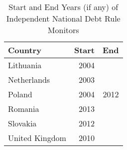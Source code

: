 \begin{table}[ht]
\centering
\caption{Start and End Years (if any) of Independent National Debt Rule Monitors} 
\label{indep_monitors}
\begin{tabular}{lrr}
  \hline
Country & Start & End \\
  \hline
Lithuania & 2004 &  \\
  Netherlands & 2003 &  \\
  Poland & 2004 & 2012 \\
  Romania & 2013 &  \\
  Slovakia & 2012 &  \\
  United Kingdom & 2010 &  \\
   \hline
\end{tabular}
\end{table}
